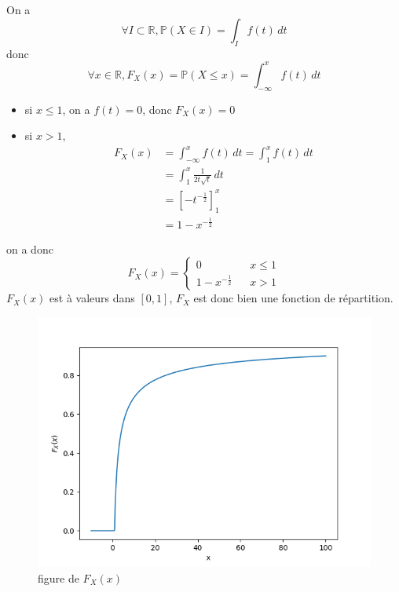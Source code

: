 \documentclass[a4paper,12pt]{book}
\begin{document}
\subsection{}
On a 
$$
\forall I \subset \mathbb{R}, \mathbb{P}(X \in I)=\int_I f(t)\,dt
$$
donc 
$$
\forall x \in \mathbb{R}, F_X(x)=\mathbb{P} (X\leq x)=\int_{-\infty}^{x} f(t)\,dt
$$
\begin{itemize}
    \item si $x \leq 1$, on a $f(t)=0$, donc $F_X(x)=0$
    \item si $x > 1$, 
    \begin{align*}
        F_X(x)&=\int_{-\infty}^{x} f(t)\,dt=\int_{1}^{x} f(t)\,dt\\
              &=\int_{1}^{x} \frac{1}{2t\sqrt{t}}\,dt\\
              &=\left[-t^{-\frac{1}{2}}\right]^x_1\\
              &=1-x^{-\frac{1}{2}}
    \end{align*}    
\end{itemize}
on a donc 
\begin{equation}  \nonumber
    F_X(x)=\left\{  
                 \begin{array}{rcl}  
                 0 & & x \leq 1\\  
                 1-x^{-\frac{1}{2}} & & x > 1
                 \end{array}  
    \right.  
\end{equation} 
$F_X(x)$ est à valeurs dans $[0,1]$, $F_X$ est donc bien une fonction de répartition. 
\begin{figure}[h]
    \begin{center}
    \includegraphics[scale=0.5]{mathdm5.png}
    \end{center}
    \caption{figure de $F_X(x)$}
\end{figure}
\end{document}
